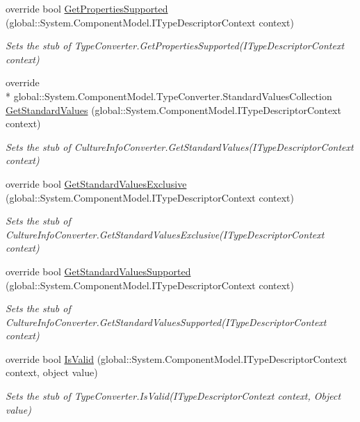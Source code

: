 \begin{DoxyCompactItemize}
override bool \hyperlink{class_system_1_1_component_model_1_1_fakes_1_1_stub_culture_info_converter_aa3e47fe4d7d80dcbb89843e849f22c3b}{Get\-Properties\-Supported} (global\-::\-System.\-Component\-Model.\-I\-Type\-Descriptor\-Context context)
\begin{DoxyCompactList}\small\item\em Sets the stub of Type\-Converter.\-Get\-Properties\-Supported(\-I\-Type\-Descriptor\-Context context)\end{DoxyCompactList}\item 
override \\*
global\-::\-System.\-Component\-Model.\-Type\-Converter.\-Standard\-Values\-Collection \hyperlink{class_system_1_1_component_model_1_1_fakes_1_1_stub_culture_info_converter_a9f252af4753293e43c319d9f0068bdf8}{Get\-Standard\-Values} (global\-::\-System.\-Component\-Model.\-I\-Type\-Descriptor\-Context context)
\begin{DoxyCompactList}\small\item\em Sets the stub of Culture\-Info\-Converter.\-Get\-Standard\-Values(\-I\-Type\-Descriptor\-Context context)\end{DoxyCompactList}\item 
override bool \hyperlink{class_system_1_1_component_model_1_1_fakes_1_1_stub_culture_info_converter_ac2f4391955fde664bed7741859d1b72a}{Get\-Standard\-Values\-Exclusive} (global\-::\-System.\-Component\-Model.\-I\-Type\-Descriptor\-Context context)
\begin{DoxyCompactList}\small\item\em Sets the stub of Culture\-Info\-Converter.\-Get\-Standard\-Values\-Exclusive(\-I\-Type\-Descriptor\-Context context)\end{DoxyCompactList}\item 
override bool \hyperlink{class_system_1_1_component_model_1_1_fakes_1_1_stub_culture_info_converter_a2c096395596ee6ad6cae47d12af07022}{Get\-Standard\-Values\-Supported} (global\-::\-System.\-Component\-Model.\-I\-Type\-Descriptor\-Context context)
\begin{DoxyCompactList}\small\item\em Sets the stub of Culture\-Info\-Converter.\-Get\-Standard\-Values\-Supported(\-I\-Type\-Descriptor\-Context context)\end{DoxyCompactList}\item 
override bool \hyperlink{class_system_1_1_component_model_1_1_fakes_1_1_stub_culture_info_converter_a21b7f603b84952bbe018d1d83f364ddb}{Is\-Valid} (global\-::\-System.\-Component\-Model.\-I\-Type\-Descriptor\-Context context, object value)
\begin{DoxyCompactList}\small\item\em Sets the stub of Type\-Converter.\-Is\-Valid(\-I\-Type\-Descriptor\-Context context, Object value)\end{DoxyCompactList}\end{DoxyCompactItemize}
